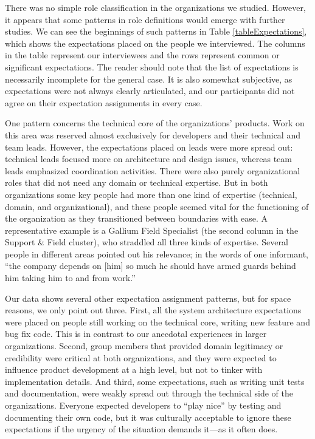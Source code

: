 \documentclass[10pt, conference, compsocconf]{IEEEtran}
\begin{document}
There was no simple role classification in the organizations we studied. However, it appears that some patterns in role definitions would emerge with further studies. We can see the beginnings of such patterns in Table \ref{tableExpectations}, which shows the expectations placed on the people we interviewed. The columns in the table represent our interviewees and the rows represent common or significant expectations. The reader should note that the list of expectations is necessarily incomplete for the general case. It is also somewhat subjective, as expectations were not always clearly articulated, and our participants did not agree on their expectation assignments in every case.

One pattern concerns the technical core of the organizations' products. Work on this area was reserved almost exclusively for developers and their technical and team leads. However, the expectations placed on leads were more spread out: technical leads focused more on architecture and design issues, whereas team leads emphasized coordination activities. There were also purely organizational roles that did not need any domain or technical expertise. But in both organizations some key people had more than one kind of expertise (technical, domain, and organizational), and these people seemed vital for the functioning of the organization as they transitioned between boundaries with ease. A representative example is a Gallium Field Specialist (the second column in the Support \& Field cluster), who straddled all three kinds of expertise. Several people in different areas pointed out his relevance; in the words of one informant, ``the company depends on [him] so much he should have armed guards behind him taking him to and from work.''

Our data shows several other expectation assignment patterns, but for space reasons, we only point out three. First, all the system architecture expectations were placed on people still working on the technical core, writing new feature and bug fix code. This is in contrast to our anecdotal experiences in larger organizations. Second, group members that provided domain legitimacy or credibility were critical at both organizations, and they were expected to influence product development at a high level, but not to tinker with implementation details. And third, some expectations, such as writing unit tests and documentation, were weakly spread out through the technical side of the organizations. Everyone expected developers to ``play nice'' by testing and documenting their own code, but it was culturally acceptable to ignore these expectations if the urgency of the situation demands it---as it often does.
\end{document}
